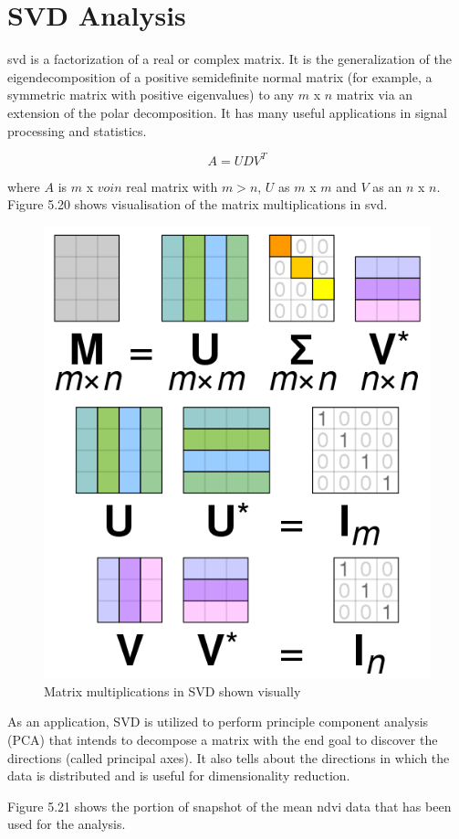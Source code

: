 \section{SVD Analysis}

\gls{svd} is a factorization of a real or complex matrix.  It is the generalization of the eigendecomposition of a positive semidefinite normal matrix (for example, a symmetric matrix with positive eigenvalues) to any $m$ x $n$ matrix via an extension of the polar decomposition. It has many useful applications in signal processing and statistics. \cite{SVD}

\begin{equation} \label{eq:svd_formula}
 A = UDV^{T}
\end{equation}

where $A$ is $m$ x $voin$ real matrix with $m>n$, $U$ as $m$ x $m$ and $V$ as an $n$ x $n$. Figure 5.20 shows visualisation of the matrix multiplications in \gls{svd}.

    \begin{figure}[H]
            \centering
            \includegraphics[width=0.5\linewidth]{figures/ch5/svd_matrix.png}
            \caption{\label{fig:svd_matrix} Matrix multiplications in SVD shown visually \cite{SVD}}
    \end{figure}

As an application, SVD is utilized to perform principle component analysis (PCA) that intends to decompose a matrix with the end goal to discover the directions (called principal axes). It also tells about the directions in which the data is distributed and is useful for dimensionality reduction.

Figure 5.21 shows the portion of snapshot of the mean \gls{ndvi} data that has been used for the analysis.

